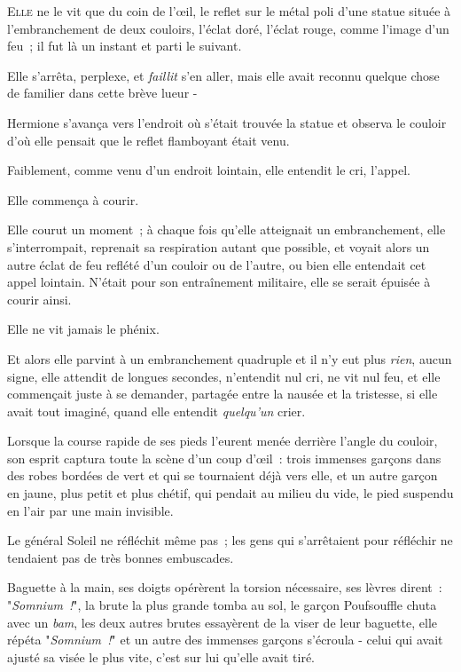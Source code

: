 
\lettrine{E}{lle} ne le vit que du coin de l'œil, le reflet sur le métal poli d'une statue située à l'embranchement de deux couloirs, l'éclat doré, l'éclat rouge, comme l'image d'un feu~; il fut là un instant et parti le suivant.

Elle s'arrêta, perplexe, et \emph{faillit} s'en aller, mais elle avait reconnu quelque chose de familier dans cette brève lueur -

Hermione s'avança vers l'endroit où s'était trouvée la statue et observa le couloir d'où elle pensait que le reflet flamboyant était venu.

Faiblement, comme venu d'un endroit lointain, elle entendit le cri, l'appel.

Elle commença à courir.

Elle courut un moment~; à chaque fois qu'elle atteignait un embranchement, elle s'interrompait, reprenait sa respiration autant que possible, et voyait alors un autre éclat de feu reflété d'un couloir ou de l'autre, ou bien elle entendait cet appel lointain. N'était pour son entraînement militaire, elle se serait épuisée à courir ainsi.

Elle ne vit jamais le phénix.

Et alors elle parvint à un embranchement quadruple et il n'y eut plus \emph{rien}, aucun signe, elle attendit de longues secondes, n'entendit nul cri, ne vit nul feu, et elle commençait juste à se demander, partagée entre la nausée et la tristesse, si elle avait tout imaginé, quand elle entendit \emph{quelqu'un} crier.

Lorsque la course rapide de ses pieds l'eurent menée derrière l'angle du couloir, son esprit captura toute la scène d'un coup d'œil~: trois immenses garçons dans des robes bordées de vert et qui se tournaient déjà vers elle, et un autre garçon en jaune, plus petit et plus chétif, qui pendait au milieu du vide, le pied suspendu en l'air par une main invisible.

Le général Soleil ne réfléchit même pas~; les gens qui s'arrêtaient pour réfléchir ne tendaient pas de très bonnes embuscades.

Baguette à la main, ses doigts opérèrent la torsion nécessaire, ses lèvres dirent~: "\emph{Somnium~!}", la brute la plus grande tomba au sol, le garçon Poufsouffle chuta avec un \emph{bam}, les deux autres brutes essayèrent de la viser de leur baguette, elle répéta "\emph{Somnium~!}" et un autre des immenses garçons s'écroula - celui qui avait ajusté sa visée le plus vite, c'est sur lui qu'elle avait tiré.

